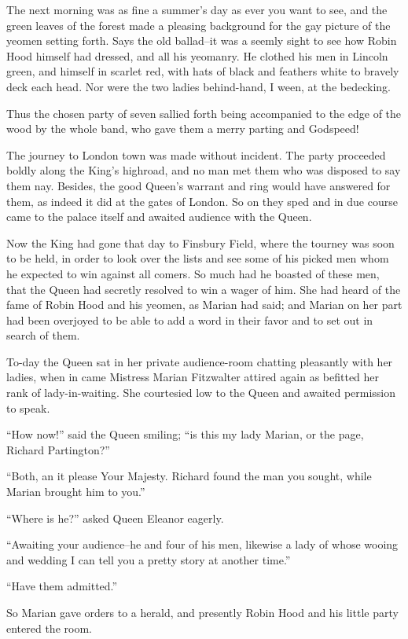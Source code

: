 The next morning was as fine a summer's day as ever you want to see, and
the green leaves of the forest made a pleasing background for the gay
picture of the yeomen setting forth. Says the old ballad--it was a
seemly sight to see how Robin Hood himself had dressed, and all his
yeomanry. He clothed his men in Lincoln green, and himself in scarlet
red, with hats of black and feathers white to bravely deck each head.
Nor were the two ladies behind-hand, I ween, at the bedecking.

Thus the chosen party of seven sallied forth being accompanied to the
edge of the wood by the whole band, who gave them a merry parting and
Godspeed!

The journey to London town was made without incident. The party
proceeded boldly along the King's highroad, and no man met them who was
disposed to say them nay. Besides, the good Queen's warrant and ring
would have answered for them, as indeed it did at the gates of London.
So on they sped and in due course came to the palace itself and awaited
audience with the Queen.

Now the King had gone that day to Finsbury Field, where the tourney was
soon to be held, in order to look over the lists and see some of his
picked men whom he expected to win against all comers. So much had he
boasted of these men, that the Queen had secretly resolved to win a
wager of him. She had heard of the fame of Robin Hood and his yeomen, as
Marian had said; and Marian on her part had been overjoyed to be able to
add a word in their favor and to set out in search of them.

To-day the Queen sat in her private audience-room chatting pleasantly
with her ladies, when in came Mistress Marian Fitzwalter attired again
as befitted her rank of lady-in-waiting. She courtesied low to the Queen
and awaited permission to speak.

``How now!'' said the Queen smiling; ``is this my lady Marian, or the
page, Richard Partington?''

``Both, an it please Your Majesty. Richard found the man you sought,
while Marian brought him to you.''

``Where is he?'' asked Queen Eleanor eagerly.

``Awaiting your audience--he and four of his men, likewise a lady of
whose wooing and wedding I can tell you a pretty story at another
time.''

``Have them admitted.''

So Marian gave orders to a herald, and presently Robin Hood and his
little party entered the room.

